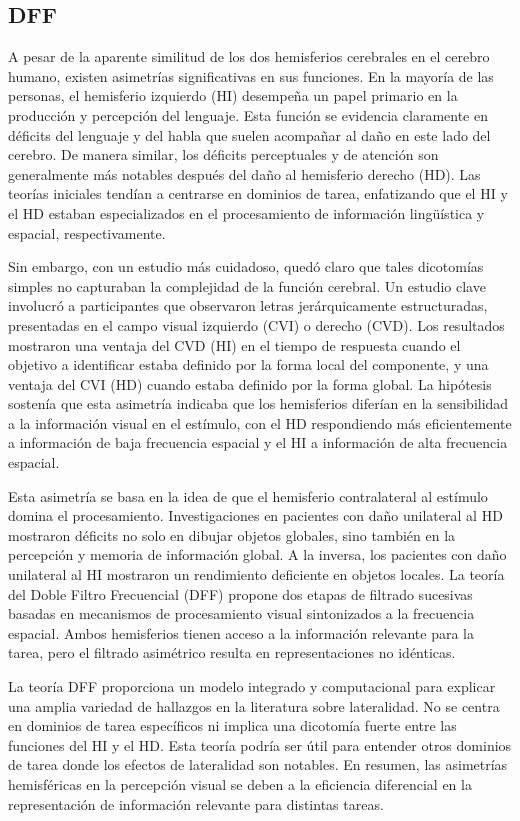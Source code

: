 \documentclass{article}
\begin{document}
	\subsection{DFF}
	
	A pesar de la aparente similitud de los dos hemisferios cerebrales en el cerebro humano, existen asimetrías significativas en sus funciones. En la mayoría de las personas, el hemisferio izquierdo (HI) desempeña un papel primario en la producción y percepción del lenguaje. Esta función se evidencia claramente en déficits del lenguaje y del habla que suelen acompañar al daño en este lado del cerebro. De manera similar, los déficits perceptuales y de atención son generalmente más notables después del daño al hemisferio derecho (HD). Las teorías iniciales tendían a centrarse en dominios de tarea, enfatizando que el HI y el HD estaban especializados en el procesamiento de información lingüística y espacial, respectivamente.
	
	Sin embargo, con un estudio más cuidadoso, quedó claro que tales dicotomías simples no capturaban la complejidad de la función cerebral. Un estudio clave involucró a participantes que observaron letras jerárquicamente estructuradas, presentadas en el campo visual izquierdo (CVI) o derecho (CVD). Los resultados mostraron una ventaja del CVD (HI) en el tiempo de respuesta cuando el objetivo a identificar estaba definido por la forma local del componente, y una ventaja del CVI (HD) cuando estaba definido por la forma global. La hipótesis sostenía que esta asimetría indicaba que los hemisferios diferían en la sensibilidad a la información visual en el estímulo, con el HD respondiendo más eficientemente a información de baja frecuencia espacial y el HI a información de alta frecuencia espacial.
	
	Esta asimetría se basa en la idea de que el hemisferio contralateral al estímulo domina el procesamiento. Investigaciones en pacientes con daño unilateral al HD mostraron déficits no solo en dibujar objetos globales, sino también en la percepción y memoria de información global. A la inversa, los pacientes con daño unilateral al HI mostraron un rendimiento deficiente en objetos locales. La teoría del Doble Filtro Frecuencial (DFF) propone dos etapas de filtrado sucesivas basadas en mecanismos de procesamiento visual sintonizados a la frecuencia espacial. Ambos hemisferios tienen acceso a la información relevante para la tarea, pero el filtrado asimétrico resulta en representaciones no idénticas.
	
	La teoría DFF proporciona un modelo integrado y computacional para explicar una amplia variedad de hallazgos en la literatura sobre lateralidad. No se centra en dominios de tarea específicos ni implica una dicotomía fuerte entre las funciones del HI y el HD. Esta teoría podría ser útil para entender otros dominios de tarea donde los efectos de lateralidad son notables. En resumen, las asimetrías hemisféricas en la percepción visual se deben a la eficiencia diferencial en la representación de información relevante para distintas tareas.
	
\end{document}
